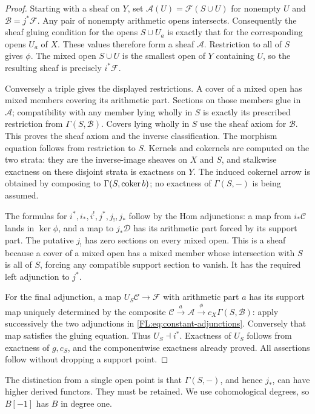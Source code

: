 \begin{proof}
Starting with a sheaf on $Y$, set
$\mathcal A(U)=\mathcal F(S\cup U)$ for nonempty $U$ and
$\mathcal B=j^*\mathcal F$. Any pair of nonempty arithmetic opens
intersects. Consequently the sheaf gluing condition for the opens
$S\cup U_a$ is exactly that for the corresponding opens $U_a$ of $X$.
These values therefore form a sheaf $\mathcal A$. Restriction to all
of $S$ gives $\phi$. The mixed open $S\cup U$ is the smallest open
of $Y$ containing $U$, so the resulting sheaf is precisely $i^*\mathcal F$.

Conversely a triple gives the displayed restrictions. A cover of a
mixed open has mixed members covering its arithmetic part. Sections
on those members glue in $\mathcal A$; compatibility with any member
lying wholly in $S$ is exactly its prescribed restriction from
$\Gamma(S,\mathcal B)$. Covers lying wholly in $S$ use the sheaf
axiom for $\mathcal B$. This proves the sheaf axiom and the inverse
classification. The morphism equation follows from restriction to
$S$. Kernels and cokernels are computed on the two strata: they are
the inverse-image sheaves on $X$ and $S$, and stalkwise exactness on
these disjoint strata is exactness on $Y$. The induced cokernel arrow
is obtained by composing to $\Gamma(S,\operatorname{coker} b)$; no exactness of
$\Gamma(S,-)$ is being assumed.

The formulas for $i^*,i_*,i^!,j^*,j_!,j_*$ follow by the Hom
adjunctions: a map from $i_*\mathcal C$ lands in $\ker\phi$, and a
map to $j_*\mathcal D$ has its arithmetic part forced by its support
part. The putative $j_!$ has zero sections on every mixed open. This
is a sheaf because a cover of a mixed open has a mixed member whose
intersection with $S$ is all of $S$, forcing any compatible support
section to vanish. It has the required left adjunction to $j^*$.

For the final adjunction, a map $U_S\mathcal C\to\mathcal F$ with
arithmetic part $a$ has its support map uniquely determined by the
composite $\mathcal C\xrightarrow a\mathcal A\xrightarrow\phi
c_X\Gamma(S,\mathcal B)$: apply successively the two adjunctions in
\eqref{FL:eq:constant-adjunctions}. Conversely that map satisfies the
gluing equation. Thus $U_S\dashv i^*$. Exactness of $U_S$ follows
from exactness of $g,c_S$, and the componentwise exactness already
proved. All assertions follow without dropping a support point.
\end{proof}

The distinction from a single open point is that $\Gamma(S,-)$, and
hence $j_*$, can have higher derived functors. They must be retained.
We use cohomological degrees, so $B[-1]$ has $B$ in degree one.

